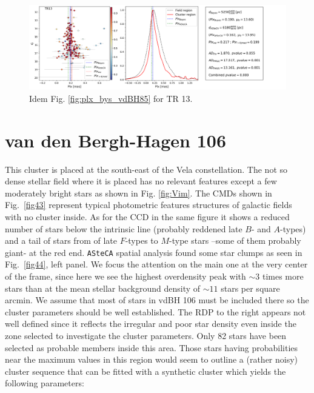 \documentclass[draft]{aa}
\begin{document}
\begin{figure}[ht]
    \centering
    \includegraphics[width=\hsize]{../figs/plx_TR13.png}
    \caption{Idem Fig. \ref{fig:plx_bys_vdBH85} for TR 13.}
    \label{fig42}
\end{figure}




\section{van den Bergh-Hagen 106}

This cluster is placed at the south-east of the Vela constellation. The not so
dense stellar field where it is placed has no relevant features except a few
moderately bright stars as shown in Fig. \ref{fig:Vim}.
The CMDs shown in Fig.~\ref{fig43} represent typical photometric features
structures of galactic fields with no cluster inside. As for the CCD in the
same figure it shows a reduced number of stars below the intrinsic line 
(probably reddened late $B$- and $A$-types) and a tail of stars from of late
$F$-types to $M$-type stars –some of them probably giant- at the red end.
%
\texttt{ASteCA} spatial analysis found some star clumps as seen in
Fig.~\ref{fig44}, left panel. We focus the attention on the main one at the very
center of the frame, since here we see the highest overdensity peak with
$\sim3$ times more stars than at the mean stellar background density of
$\sim11$ stars per square arcmin.
We assume that most of stars in vdBH 106 must be included there so the cluster
parameters should be well established. The RDP to the right appears not well
defined since it reflects the irregular and poor star density even inside the
zone selected to investigate the cluster parameters.
Only 82 stars have been selected as probable members inside this area.
Those stars having probabilities near the maximum values in this region would
seem to outline a (rather noisy) cluster sequence that can be fitted with a
synthetic cluster which yields the following parameters:
\end{document}
